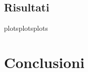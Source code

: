 \documentclass[
12pt, %
a4paper, %
oneside, %
headinclude,footinclude, %
BCOR5mm, %
]{scrartcl}
\begin{document}
\subsection{Risultati}
plotsplotsplots

\section{Conclusioni}\label{sec:conclusioni}


\renewcommand{\refname}{\spacedlowsmallcaps{References}} %




\end{document}
